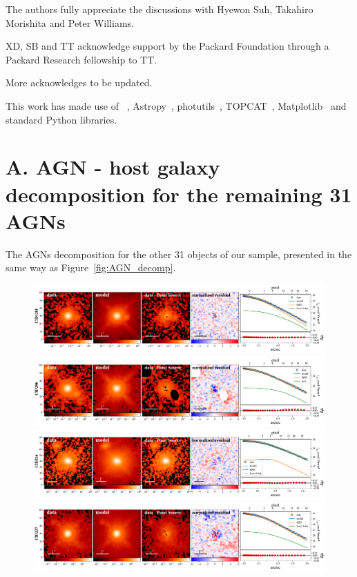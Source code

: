 \documentclass[apj]{emulateapj}
\begin{document}
The authors fully appreciate the discussions with Hyewon Suh, Takahiro Morishita and Peter Williams.

XD, SB and TT acknowledge support by the Packard Foundation through a Packard Research fellowship to TT.

{\color{red} More acknowledges to be updated.}

This work has made use of \lenstronomy~\citep{lenstronomy}, {\sc Astropy}~\citep{Astropy}, {\sc photutils}~\citep{photutils}, {\sc TOPCAT}~\citep{TOPCAT}, {\sc Matplotlib}~\citep{Matplotlib} %
and standard Python libraries.




\newpage

\appendix

\section{A. AGN - host galaxy decomposition for the remaining 31 AGNs}\label{sec:restsample}
The AGNs decomposition for the other 31 objects of our sample, presented in the same way as Figure~\ref{fig:AGN_decomp}.

\begin{figure}[ht]
\centering
{
\includegraphics[height=0.25\textwidth]{fig/best_fit_CID1281_SB_profile.pdf}
\includegraphics[height=0.25\textwidth]{fig/best_fit_CID206_SB_profile.pdf}
\includegraphics[height=0.25\textwidth]{fig/best_fit_CID216_SB_profile.pdf}
\includegraphics[height=0.25\textwidth]{fig/best_fit_CID237_SB_profile.pdf}
}
\end{figure} 
\end{document}
